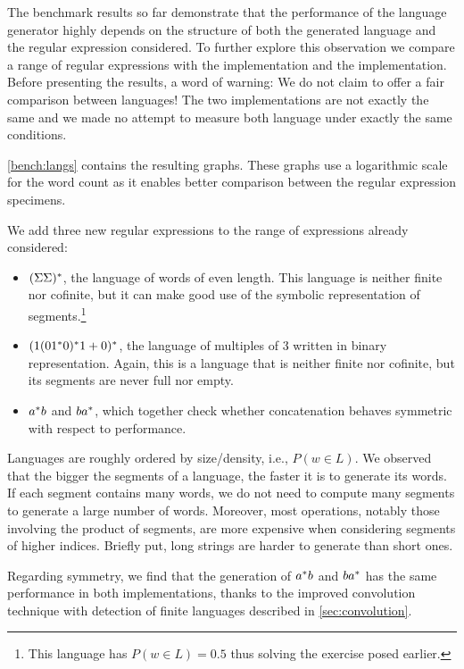 The benchmark results so far demonstrate that the performance of the language
generator highly depends on the structure of both
the generated language and the regular expression considered.
To further explore this observation we compare a range of regular expressions
with the  \haskell implementation and the 
\ocaml implementation.
Before presenting the results, a word of warning:
We do not claim to offer a fair comparison between languages!
The two implementations are not exactly the same and we made no attempt
to measure both language under exactly the same conditions.

\cref{bench:langs} contains the resulting graphs.  These graphs use a
logarithmic scale for the word count as it enables better comparison
between the regular expression specimens.

We add three new regular expressions to the range of expressions already considered:
\begin{itemize}
\item $(\Sigma\Sigma)^*$, the language of words of even
  length. This language is neither finite nor cofinite, but it can make
  good use of the symbolic representation of segments.\footnote{This
    language has $P (w \in L) = 0.5$ thus solving the exercise posed
    earlier.}
\item $(1 (01^*0)^*1 +{0})^*$, the language
  of multiples of 3 written in binary representation. Again, this is a language that is neither
  finite nor cofinite, but its segments are never full nor empty.
\item $a^*b$ and $ba^*$, which together check whether
  {concatenation} behaves symmetric with respect to performance.
\end{itemize}

Languages are roughly ordered by size/density, i.e., $P (w\in L)$. We
observed that the bigger the segments of a language, the faster it is
to generate its words.  If each segment contains many words, we do not
need to compute many segments to generate a large number of words.
Moreover, most operations, notably those involving the product of
segments, are more expensive when considering segments of higher
indices. Briefly put, long strings are harder to generate than short
ones.

Regarding symmetry, we find that the generation of $a^*b$ and
$ba^*$ has the same performance in both implementations,
thanks to the improved convolution technique
with detection of finite languages described in \cref{sec:convolution}.



